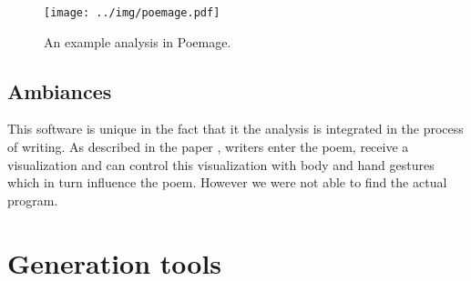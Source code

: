 \begin{figure}[h]\centering
	\texttt{[image: ../img/poemage.pdf]}
	\caption{An example analysis in Poemage.}\label{screenshotPoemage}
\end{figure}

\subsection{Ambiances}
This software is unique in the fact that it the analysis is integrated in the process of writing. As described in the paper \cite{Meneses2015}, writers enter the poem, receive a visualization and can control this visualization with body and hand gestures which in turn influence the poem. However we were not able to find the actual program.


\section{Generation tools}
